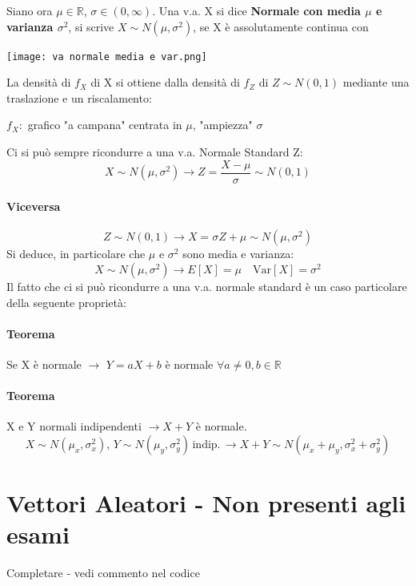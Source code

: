 \documentclass[12pt, a4paper, openany]{book}
\begin{document}
Siano ora $\mu \in \mathbb{R}$, $\sigma \in (0, \infty)$.
Una v.a. X si dice \textbf{Normale con media $\mu$ e varianza $\sigma^2$}, si scrive
\textbf{$X \sim N(\mu, \sigma^2)$}, se X è assolutamente continua con
\begin{center}
    \texttt{[image: va normale media e var.png]}
\end{center}
La densità di $f_X$ di X si ottiene dalla densità di $f_Z$ di $Z \sim N(0,1)$
mediante una traslazione e un riscalamento:
\begin{center}
    $f_X:$ grafico "a campana" centrata in $\mu$, "ampiezza" $\sigma$
\end{center}
Ci si può sempre ricondurre a una v.a. Normale Standard Z:
\begin{equation*}
    X \sim N(\mu, \sigma^2) \rightarrow Z = \frac{X-\mu}{\sigma} \sim N(0,1)
\end{equation*}
\paragraph*{Viceversa}
\begin{equation*}
    Z \sim N(0,1) \rightarrow X = \sigma Z + \mu \sim N(\mu, \sigma^2)
\end{equation*}
Si deduce, in particolare che $\mu$ e $\sigma^2$ sono media e varianza:
\begin{equation*}
    X \sim N(\mu, \sigma^2) \rightarrow E[X] = \mu \quad \text{Var}[X] = \sigma^2
\end{equation*}
Il fatto che ci si può ricondurre a una v.a. normale standard è un caso particolare
della seguente proprietà:
\paragraph*{Teorema} Se X è normale $\rightarrow$ $Y = aX+b$ è normale 
$\forall a \neq 0, b \in \mathbb{R}$
\paragraph*{Teorema} X e Y normali indipendenti $\rightarrow X+Y$ è normale.
\begin{equation*}
    X \sim N(\mu_x, \sigma^{2}_x), \, Y \sim N(\mu_y, \sigma^{2}_y)\, \text{indip.}\,
    \rightarrow X+Y \sim N(\mu_x+\mu_y, \sigma^{2}_x + \sigma^{2}_y)
\end{equation*}
\section*{Vettori Aleatori - Non presenti agli esami}
Completare - vedi commento nel codice
\end{document}
